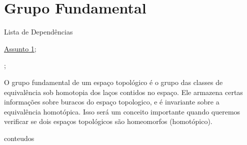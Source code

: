
\maketitle
\section{Grupo Fundamental}
\label{grupo-fundamental}

\begin{titlemize}{Lista de Dependências}
	\item \hyperref[assunto1]{Assunto 1};\\ %
	\item \hyperref[]{};
\end{titlemize}

O grupo fundamental de um espaço topológico é o grupo das classes de equivalência sob homotopia dos laços contidos no espaço. Ele armazena certas informações sobre buracos do espaço topologico, e é invariante sobre a equivalência homotópica. Isso será um conceito importante quando queremos verificar se dois espaços topológicos são homeomorfos (homotópico).

{conteudos}%



